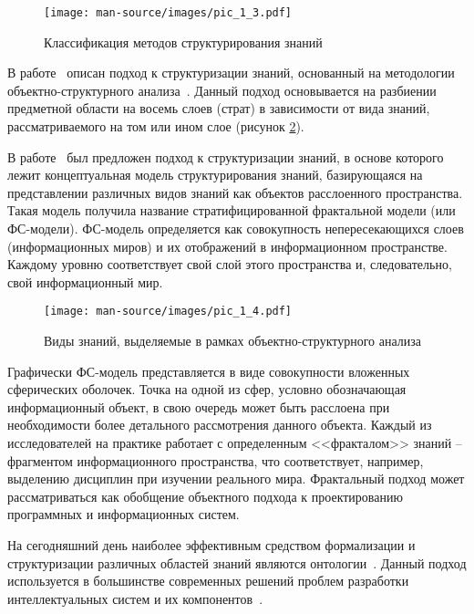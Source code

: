 \begin{figure}[H]
\begin{center}
\texttt{[image: man-source/images/pic\_1\_3.pdf]}\\[2mm]
\caption{Классификация методов структурирования знаний}\label{pic_1.3}
\end{center}
\end{figure}

В работе~\cite{Gavrilova2016} описан подход к структуризации знаний, основанный на методологии объектно-структурного анализа~\cite{Gavrilova1995}. Данный подход основывается на разбиении предметной области на восемь слоев (страт) в зависимости от вида знаний, рассматриваемого на том или ином слое (рисунок \ref{pic_1.4}).

В работе~\cite{Krivorutski1995} был предложен подход к структуризации знаний, в основе которого лежит концептуальная модель структурирования знаний, базирующаяся на представлении различных видов знаний как объектов расслоенного пространства. Такая модель получила название стратифицированной фрактальной модели (или ФС-модели). ФС-модель определяется как совокупность непересекающихся слоев (информационных миров) и их отображений в информационном пространстве. Каждому уровню соответствует свой слой этого пространства и, следовательно, свой информационный мир.


\begin{figure}[H]
\begin{center}
\texttt{[image: man-source/images/pic\_1\_4.pdf]}\\[2mm]
\caption{Виды знаний, выделяемые в рамках объектно-структурного анализа}
\label{pic_1.4}
\end{center}
\end{figure}


Графически ФС-модель представляется в виде совокупности вложенных сферических оболочек. Точка на одной из сфер, условно обозначающая информационный объект, в свою очередь может быть расслоена при необходимости более детального рассмотрения данного объекта. Каждый из исследователей на практике работает с определенным <<фракталом>> знаний – фрагментом информационного пространства, что соответствует, например, выделению дисциплин при изучении реального мира. Фрактальный подход может рассматриваться как обобщение объектного подхода к проектированию программных и информационных систем.

На сегодняшний день наиболее эффективным средством формализации и структуризации различных областей знаний являются онтологии~\cite{Guarino1995}. Данный подход используется в большинстве современных решений проблем разработки интеллектуальных систем и их компонентов~\cite{BorgestRole2014, BorgestVvedenie2014, Gavrilova2016, Gladun2013, Globa2014, Fillipov2016, Efimenko2011, Kleschev2001, Kudruavtsev2010, Lapshin2010, Rubashkin2012, Gruber1995, Guarino1995, Karray2012, Mizoguchi1995, Sowa1995}. 

